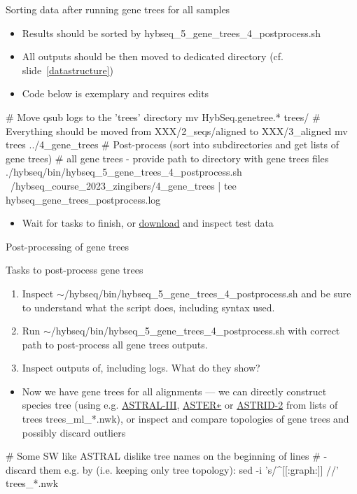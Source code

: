 \documentclass[compress, ucs, xelatex, 11pt, xcolor=x11names, aspectratio=169,
	hyperref={
		bookmarks=true,
		unicode=true,
		colorlinks=true,
		pdftitle={HybSeq course},
		plainpages=false,
		pdfauthor={Vojtech Zeisek},
		pdfsubject={Practical processing of HybSeq target enrichment sequencing data on computing grids like MetaCentrum},
		pdfcreator={XeLaTeX},
		pdfkeywords={BASH, command line, GNU, HybSeq, Linux, MetaCentrum, sequencing shell, target enrichment},
		linkcolor=Turquoise4, %
		anchorcolor=DodgerBlue4, %
		citecolor=DodgerBlue4, %
		filecolor=DodgerBlue4, %
		menucolor=Tan4, %
		urlcolor=DarkOliveGreen4, %
		pdftex},
	url={hyphens, lowtilde} %
	]{beamer}
\renewcommand{\texttt}[1]{\colorbox{Cornsilk2}{{\ttfamily #1}}}
\renewcommand{\alert}[1]{\textcolor{OrangeRed3}{#1}}
\begin{document}
\begin{frame}[fragile]{Sorting data after running gene trees for all samples}
	\begin{itemize}
		\item Results should be sorted by \texttt{hybseq\_5\_gene\_trees\_4\_postprocess.sh}
		\item All outputs should be then moved to dedicated directory (cf. slide~\ref{datastructure})
		\item \alert{Code below is exemplary and requires edits}
	\end{itemize}
	\begin{bashcode}
    # Move qsub logs to the 'trees' directory
    mv HybSeq.genetree.* trees/
    # Everything should be moved from XXX/2_seqs/aligned to XXX/3_aligned
    mv trees ../4_gene_trees
    # Post-process (sort into subdirectories and get lists of gene trees)
    # all gene trees - provide path to directory with gene trees files
    ./hybseq/bin/hybseq_5_gene_trees_4_postprocess.sh
      ~/hybseq_course_2023_zingibers/4_gene_trees | tee
      hybseq_gene_trees_postprocess.log
	\end{bashcode}
	\begin{itemize}
		\item Wait for tasks to finish, or \href{https://botany.natur.cuni.cz/zeisek/hybseq_course_zingibers_4_gene_trees.zip}{download} and inspect test data
	\end{itemize}
\end{frame}

\begin{frame}[fragile]{Post-processing of gene trees}
	\begin{exampleblock}{Tasks to post-process gene trees}
		\begin{enumerate}
			\item Inspect \texttt{$\sim$/hybseq/bin/hybseq\_5\_gene\_trees\_4\_postprocess.sh} and be sure to understand what the script does, including syntax used.
			\item Run \texttt{$\sim$/hybseq/bin/hybseq\_5\_gene\_trees\_4\_postprocess.sh} with correct path to post-process all gene trees outputs.
			\item Inspect outputs of, including logs. What do they show?
		\end{enumerate}
	\end{exampleblock}
	\begin{itemize}
		\item Now we have gene trees for all alignments --- we can directly construct species tree (using e.g. \href{https://github.com/smirarab/ASTRAL}{ASTRAL-III}, \href{https://github.com/chaoszhang/ASTER}{ASTER∗} or \href{https://github.com/pranjalv123/ASTRID}{ASTRID-2} from lists of trees \texttt{trees\_ml\_*.nwk}), or inspect and compare topologies of gene trees and possibly discard outliers
	\end{itemize}
	\begin{bashcode}
    # Some SW like ASTRAL dislike tree names on the beginning of lines
    # - discard them e.g. by (i.e. keeping only tree topology):
    sed -i 's/^[[:graph:]]\+ //' trees_*.nwk
	\end{bashcode}
\end{frame}
\end{document}
